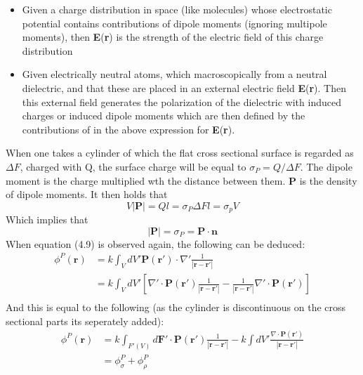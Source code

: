 \begin{itemize}
    \item{Given a charge distribution in space (like molecules) whose electrostatic potential contains contributions of dipole moments (ignoring multipole moments), then \textbf{E}(\textbf{r}) is the strength of the electric field of this charge distribution     } 
    \item{Given electrically neutral atoms, which macroscopically from a neutral dielectric, and that these are placed in an external electric field \textbf{E}(\textbf{r}). Then this external field generates the polarization of the dielectric with induced
     charges or induced dipole moments which are then defined by the contributions of in the above expression for \textbf{E}(\textbf{r}).
     
    }
\end{itemize}
When one takes a cylinder of which the flat cross sectional surface is regarded as $\Delta F$, charged with Q, the surface charge will be equal to $\sigma_P = Q/\Delta F$. The dipole moment is the 
charge multiplied wth the distance between them. $\textbf{P}$ is the density of dipole moments. It then holds that 
\begin{equation}
    V|\textbf{P}| = Ql = \sigma_P\Delta Fl = \sigma_p V
\end{equation}
Which implies that
\begin{equation}
    |\textbf{P}| = \sigma_P = \textbf{P}\cdot \textbf{n}
\end{equation}
When equation (4.9) is observed again, the following can be deduced:
\begin{equation}
        \begin{aligned}
            \phi^P(\textbf{r}) &= k\int_V dV' \textbf{P}(\textbf{r}') \cdot \nabla' \frac{1}{|\textbf{r}-\textbf{r}'|}\\
            &= k\int_V dV' \left[\nabla' \cdot \textbf{P}(\textbf{r}')\frac{1}{|\textbf{r}-\textbf{r}'|} -\frac{1}{|\textbf{r}-\textbf{r}'|} \nabla' \cdot \textbf{P}(\textbf{r}') \right]\\
        \end{aligned}   
\end{equation}
And this is equal to the following (as the cylinder is discontinuous on the cross sectional parts its seperately added):
\begin{equation}
    \begin{aligned}
        \phi^P(\textbf{r}) &= k\int_{F'(V)}d \textbf{F}' \cdot \textbf{P}(\textbf{r}')\frac{1}{|\textbf{r}-\textbf{r}'|}- k\int dV' \frac{\nabla \cdot \textbf{P}(\textbf{r}')}{|\textbf{r}-\textbf{r}'|}\\
        & = \phi^P_\sigma + \phi^P_\rho
    \end{aligned}
\end{equation}

